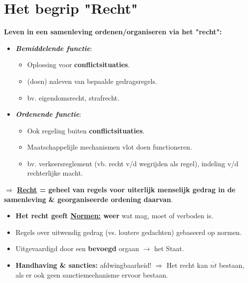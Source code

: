 \section{Het begrip "Recht"}

\textbf{Leven in een samenleving ordenen/organiseren via het "recht":}
\begin{itemize}
	\item \textit{\textbf{Bemiddelende functie}}:
	\begin{itemize}
		\item Oplossing voor \textbf{conflictsituaties}.
		\item (doen) naleven van bepaalde gedragsregels.
		\item  bv. eigendomsrecht, strafrecht.
	\end{itemize}
	\item \textit{\textbf{Ordenende functie}}:
	\begin{itemize}
		\item Ook regeling buiten \textbf{conflictsituaties}.
		\item Maatschappelijle mechanismen vlot doen functioneren.
		\item bv. verkeersreglement (vb. recht v/d wegrijden als regel), indeling v/d rechterlijke macht.
	\end{itemize}
\end{itemize}
$\Rightarrow$ \textbf{\underline{Recht} = geheel van regels voor uiterlijk menselijk gedrag in de samenleving \& georganiseerde ordening daarvan}.
\begin{itemize}
	\item \textbf{Het recht geeft \underline{Normen:} weer} wat mag, moet of verboden is.
	\item Regels over uitwendig gedrag (vs. loutere gedachten) gebaseerd op normen.
	\item Uitgevaardigd door een \textbf{bevoegd} orgaan $\rightarrow$ het Staat.
	\item \textbf{Handhaving \& sancties:} afdwingbaarheid! $\Rightarrow$ Het recht kan $\overline{nt}$ bestaan, als er ook geen sanctiemechanisme ervoor bestaan.
\end{itemize}
